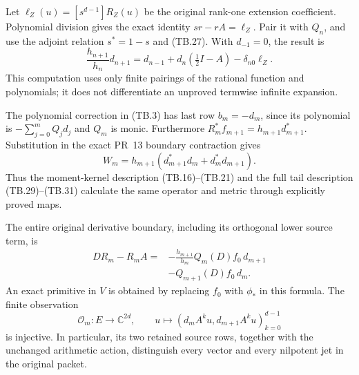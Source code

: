 Let \(\ell_Z(u)=[s^{d-1}]R_Z(u)\) be the original rank-one
extension coefficient.  Polynomial division gives the exact
identity \(sr-rA=\ell_Z\).  Pair it with \(Q_n\), and use
the adjoint relation \(s^*=1-s\) and (TB.27).  With \(d_{-1}=0\),
the result is
\[
 \boxed{\frac{h_{n+1}}{h_n}d_{n+1}
 =d_{n-1}+d_n(\tfrac12 I-A)-\delta_{n0}\ell_Z.}
 \tag{TB.30}
\]
This computation uses only finite pairings of the rational
function and polynomials; it does not differentiate an
unproved termwise infinite expansion.

The polynomial correction in (TB.3) has last row
\(b_m=-d_m\), since its polynomial is
\(-\sum_{j=0}^mQ_jd_j\) and \(Q_m\) is monic.
Furthermore
\(R_m^*f_{m+1}=h_{m+1}d_{m+1}^*\).
Substitution in the exact PR~13 boundary contraction gives
\[
 \boxed{W_m=h_{m+1}
       (d_{m+1}^*d_m+d_m^*d_{m+1}).}
 \tag{TB.31}
\]
Thus the moment-kernel description (TB.16)--(TB.21) and the
full tail description (TB.29)--(TB.31) calculate the same
operator and metric through explicitly proved maps.

\begin{theorem}
The entire original derivative boundary, including its
orthogonal lower source term, is
\[
 \boxed{\begin{aligned}
 DR_m-R_mA
 ={}&-\frac{h_{m+1}}{h_m}Q_m(D)f_0\,d_{m+1}\\
    &-Q_{m+1}(D)f_0\,d_m .
 \end{aligned}}
 \tag{TB.35}
\]
An exact primitive in \(V\) is obtained by replacing \(f_0\)
with \(\phi_*\) in this formula.  The finite observation
\[
 \mathcal O_m:E\longrightarrow\mathbb C^{2d},\qquad
 u\longmapsto(d_mA^ku,d_{m+1}A^ku)_{k=0}^{d-1}
 \tag{TB.36}
\]
is injective.  In particular, its two retained source rows,
together with the unchanged arithmetic action, distinguish
every vector and every nilpotent jet in the original packet.
\end{theorem}

